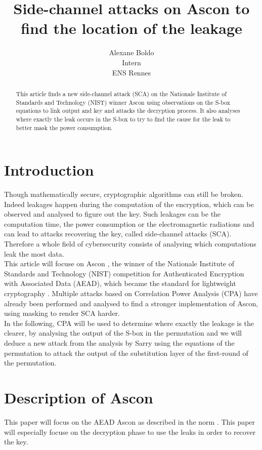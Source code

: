 \documentclass[a4paper,11pt,twocolumn]{article}
\author{
		Alexane Boldo\\
		Intern\\
		ENS Rennes
	}
\title{Side-channel attacks on Ascon to find the location of the leakage}
\date{}
\begin{document}
		\maketitle
		
		\begin{abstract}
			This article finds a new side-channel attack (SCA) on the Nationale Institute of Standards and Technology (NIST) winner Ascon using observations on the S-box equations to link output and key and attacks the decryption process. It also analyses where exactly the leak occurs in the S-box to try to find the cause for the leak to better mask the power consumption.
		\end{abstract}
		
		
		\section{Introduction}
		Though mathematically secure, cryptographic algorithms can still be broken. Indeed leakages happen during the computation of the encryption, which can be observed and analysed to figure out the key. Such leakages can be the computation time, the power consumption or the electromagnetic radiations and can lead to attacks recovering the key, called side-channel attacks (SCA). Therefore a whole field of cybersecurity consists of analysing which computations leak the most data.\\
		This article will focuse on Ascon \cite{ascon}, the winner of the Nationale Institute of Standards and Technology (NIST) competition for Authenticated Encryption with Associated Data (AEAD), which became the standard for lightweight cryptography \cite{norme}. Multiple attacks \cite{cpa_lin,dl_cpa} based on Correlation Power Analysis (CPA) have already been performed and analysed \cite{cpa_analysis} to find a stronger implementation of Ascon, using masking to render SCA harder.\\
		In the following, CPA will be used to determine where exactly the leakage is the clearer, by analysing the output of the S-box in the permutation and we will deduce a new attack from the analysis by Sarry \cite{these} using the equations of the permutation to attack the output of the substitution layer of the first-round of the permutation.
		
		\section{Description of Ascon}
		This paper will focus on the AEAD Ascon as described in the norm \cite{norme}. This paper will especially focuse on the decryption phase to use the leaks in order to recover the key.
		
\end{document}
